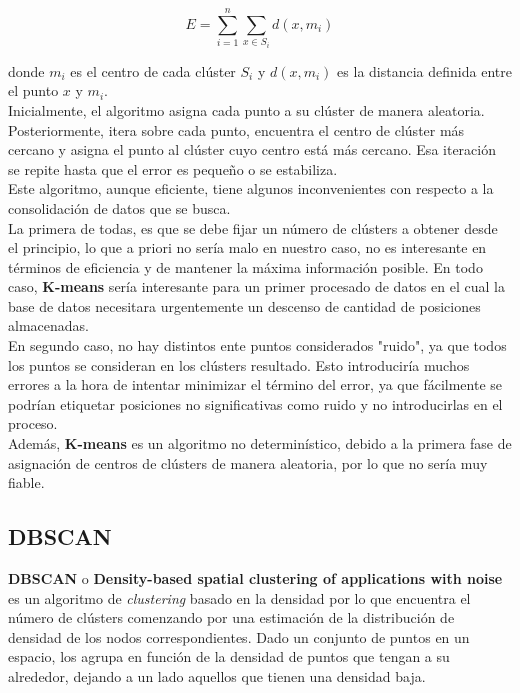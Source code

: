 \documentclass[a4paper, 12pt, spanish]{article}
\begin{document}
$$ E=\sum_{i=1}^{n} \sum_{x\in S_i} d(x, m_i) $$

donde $m_i$ es el centro de cada cl\'uster $S_i$ y $d(x, m_i)$ es la distancia definida entre el punto $x$ y $m_i$.\\

Inicialmente, el algoritmo asigna cada punto a su cl\'uster de manera aleatoria. Posteriormente, itera sobre cada punto, encuentra el centro de cl\'uster m\'as cercano y asigna el punto al cl\'uster cuyo centro est\'a m\'as cercano. Esa iteraci\'on se repite hasta que el error es peque\~no o se estabiliza.\\

Este algoritmo, aunque eficiente, tiene algunos inconvenientes con respecto a la consolidaci\'on de datos que se busca.\\

La primera de todas, es que se debe fijar un n\'umero de cl\'usters a obtener desde el principio, lo que a priori no ser\'ia malo en nuestro caso, no es interesante en t\'erminos de eficiencia y de mantener la m\'axima informaci\'on posible. En todo caso, \textbf{K-means} ser\'ia interesante para un primer procesado de datos en el cual la base de datos necesitara urgentemente un descenso de cantidad de posiciones almacenadas. \\

En segundo caso, no hay distintos ente puntos considerados "ruido", ya que todos los puntos se consideran en los cl\'usters resultado. Esto introducir\'ia muchos errores a la hora de intentar minimizar el t\'ermino del error, ya que f\'acilmente se podr\'ian etiquetar posiciones no significativas como ruido y no introducirlas en el proceso.\\

Adem\'as, \textbf{K-means} es un algoritmo no determin\'istico, debido a la primera fase de asignaci\'on de centros de cl\'usters de manera aleatoria, por lo que no ser\'ia muy fiable.\\


\subsection{DBSCAN}
\textbf{DBSCAN}\cite{importantPlaces} o \textbf{Density-based spatial clustering of applications with noise} es un algoritmo de \textit{clustering} basado en la densidad por lo que encuentra el n\'umero de cl\'usters comenzando por una estimaci\'on de la distribuci\'on de densidad de los nodos correspondientes. Dado un conjunto de puntos en un espacio, los agrupa en funci\'on de la densidad de puntos que tengan a su alrededor, dejando a un lado aquellos que tienen una densidad baja. \\
\end{document}
